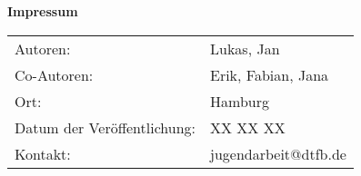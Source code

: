 \thispagestyle{empty}



\null
\vfill
\vfill
{\raggedright \normalfont \bfseries Impressum}
\vspace{0.5cm}

{
  \raggedright

\begin{tabular}{ll}
  Autoren: & Lukas, Jan 
    \\%
  Co-Autoren: & Erik, Fabian, Jana
    \\%
  Ort: &  Hamburg
    \\%
  Datum der Veröffentlichung: & XX XX XX
    \\%
  Kontakt: & jugendarbeit@dtfb.de
    \\%
\end{tabular}
}
\vfill

